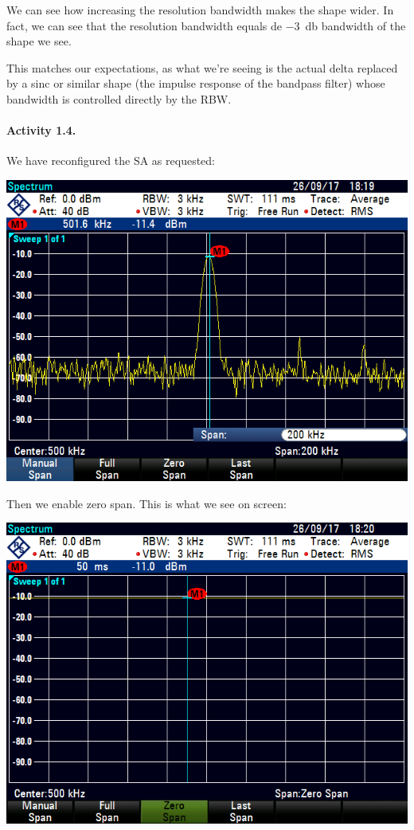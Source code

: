 We can see how increasing the resolution bandwidth makes the shape wider.
In fact, we can see that the resolution bandwidth equals de \SI{-3}{\decibel}
bandwidth of the shape we see.

This matches our expectations, as what we're seeing is the actual delta
replaced by a sinc or similar shape (the impulse response of the bandpass
filter) whose bandwidth is controlled directly by the RBW.

\finishpage


\startpage
\paragraph{Activity 1.4.}

We have reconfigured the SA as requested:

\includegraphics[width=\textwidth]{assets/1-4}

Then we enable zero span. This is what we see on screen:

\includegraphics[width=\textwidth]{assets/1-4-2}

